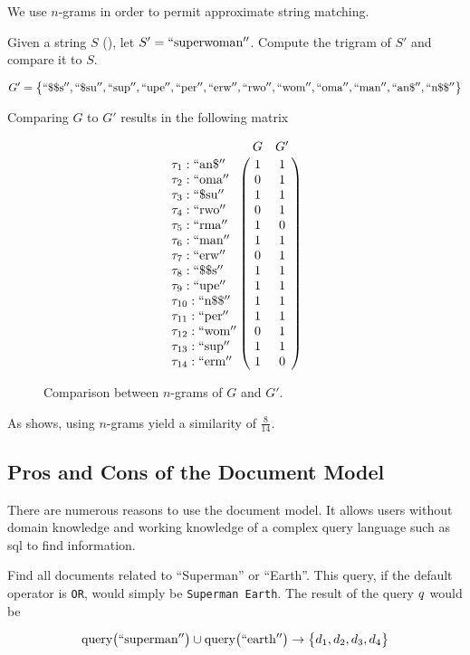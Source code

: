 		We use $n$-grams in order to permit approximate string matching.
		
		\begin{ex}
		\label{ex:n-gram-comparison}
			Given a string $S$ (), let $S' = \mathrm{``superwoman''}$.  Compute the trigram of $S'$ and compare it to $S$.
			
			\[
				G' = \bigl\{
					\mathrm{``\char"24\char"24s''},
					\mathrm{``\char"24su''},
					\mathrm{``sup''},
					\mathrm{``upe''},
					\mathrm{``per''},
					\mathrm{``erw''},
					\mathrm{``rwo''},
					\mathrm{``wom''},
					\mathrm{``oma''},
					\mathrm{``man''},
					\mathrm{``an\char"24''},
					\mathrm{``n\char"24\char"24''}
				\bigr\}
			\]
			
			Comparing $G$ to $G'$ results in the following matrix
			
			\begin{figure}[!ht]
				\[
					\bordermatrix{
						~ & G & G' \cr
						\term_1 : \mathrm{``an\char"24''} & 1 & 1 \cr
						\term_2 : \mathrm{``oma''} & 0 & 1 \cr
						\term_3 : \mathrm{``\char"24su''} & 1 & 1 \cr
						\term_4 : \mathrm{``rwo''} & 0 & 1 \cr
						\term_5 : \mathrm{``rma''} & 1 & 0 \cr
						\term_6 : \mathrm{``man''} & 1 & 1 \cr
						\term_7 : \mathrm{``erw''} & 0 & 1 \cr
						\term_8 : \mathrm{``\char"24\char"24s''} & 1 & 1 \cr
						\term_9 : \mathrm{``upe''} & 1 & 1 \cr
						\term_{10} : \mathrm{``n\char"24\char"24''} & 1 & 1 \cr
						\term_{11} : \mathrm{``per''} & 1 & 1 \cr
						\term_{12} : \mathrm{``wom''} & 0 & 1 \cr
						\term_{13} : \mathrm{``sup''} & 1 & 1 \cr
						\term_{14} : \mathrm{``erm''} & 1 & 0 \cr
					}
				\]
				
				\caption{Comparison between $n$-grams of $G$ and $G'$.}
				\label{fig:n-gram-misspelling-comparison}
			\end{figure}
			
			As  shows, using $n$-grams yield a similarity of $\frac{8}{14}$.
		\end{ex}
			
	\subsection{Pros and Cons of the Document Model}
		There are numerous reasons to use the document model.  It allows users without domain knowledge and working knowledge of a complex query language such as \gls{sql} to find information.
		
		\begin{ex}
			Find all documents related to ``Superman'' or ``Earth''.  This query, if the default operator is \texttt{OR}, would simply be \texttt{Superman Earth}.	The result of the query $q$ would be
			
			\[
				\operatorname{query}\bigl(\mathrm{``superman''}\bigr) \cup \operatorname{query}\bigl(\mathrm{``earth''}\bigr) \rightarrow \bigl\{d_1, d_2, d_3, d_4\bigr\}
			\]
		\end{ex}
		
